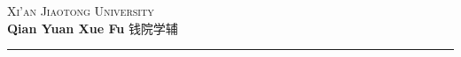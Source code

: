 \documentclass[a4paper,12pt]{article}
\begin{document}
\begin{center}
\Huge \textsc{Xi'an Jiaotong University}\\[0.5\baselineskip]
\LARGE \textbf{Qian Yuan Xue Fu} {\kaishu 钱院学辅}
\end{center}

\hrule

\vfill\thispagestyle{empty}
\end{document}
